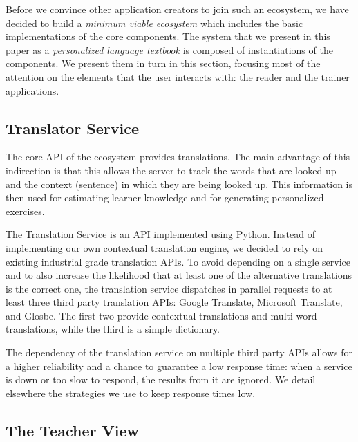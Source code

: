 

Before we convince other application creators to join such an ecosystem, we have decided to build a {\em minimum viable ecosystem} which includes the basic implementations of the core components. The system that we present in this paper as a {\em personalized language textbook} is composed of instantiations of the components. We present them in turn in this section, focusing most of the attention on the elements that the user interacts with: the reader and the trainer applications. 









\subsection{Translator Service}

The core API of the ecosystem provides translations. The main advantage of this indirection is that this allows the server to track the words that are looked up and the context (sentence) in which they are being looked up. This information is then used for estimating learner knowledge and for generating personalized exercises. 

The Translation Service is an API implemented using Python. Instead of implementing our own contextual translation engine, we decided to rely on existing industrial grade translation APIs. To avoid depending on a single service and to also increase the likelihood that at least one of the alternative translations is the correct one, the translation service dispatches in parallel requests to at least three third party translation APIs: Google Translate, Microsoft Translate, and Glosbe. \cite{Jager17-mux} The first two provide contextual translations and multi-word translations, while the third is a simple dictionary. 

The dependency of the translation service on multiple third party APIs allows for a higher reliability and a chance to guarantee a low response time: when a service is down or too slow to respond, the results from it are ignored. We detail elsewhere the strategies we use to keep response times low\cite{Jager17-mux}.

\subsection{The Teacher View}

